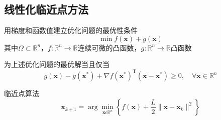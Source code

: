 \subsection{线性化临近点方法}
用梯度和函数值建立优化问题的最优性条件
\[
    \min f(\boldsymbol{x})+g(\boldsymbol{x})
\]
其中$\Omega\subset\mathbb{R}^n$，$f:\mathbb{R}^n\to\mathbb{R}$连续可微的凸函数，$g:\mathbb R^n\to\mathbb R$凸函数
\begin{theorem}
    为上述优化问题的最优解当且仅当
    \[
        g(\boldsymbol{x})-g(\boldsymbol{x}^*)+\nabla f(\boldsymbol{x}^*)^\mathrm{T}(\boldsymbol{x}-\boldsymbol{x}^*)\geqslant 0,\quad\forall\boldsymbol{x}\in\mathbb{R}^n
    \]
\end{theorem}
\begin{note}
    临近点算法
    \[
        \boldsymbol{x}_{k+1}=\arg\min_{\boldsymbol{x}\epsilon\mathbb{R}^{n}}\left\{f(\boldsymbol{x})+\frac{L}{2}\|\boldsymbol{x}-\boldsymbol{x}_{k}\|^{2}\right\}
    \]
\end{note}
